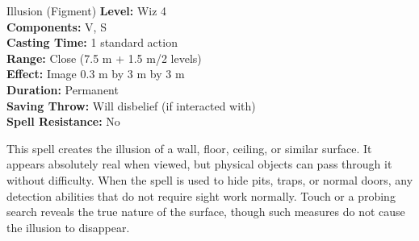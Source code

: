 {Illusion (Figment)}
{
	\textbf{Level:}
	Wiz 4\\
	\textbf{Components:}
	V, S\\
	\textbf{Casting Time:}
	1 standard action\\
	\textbf{Range:}
	Close (7.5 m + 1.5 m/2 levels)\\
	\textbf{Effect:}
	Image 0.3 m by 3 m by 3 m\\
	\textbf{Duration:}
	Permanent\\
	\textbf{Saving Throw:}
	Will disbelief (if interacted with)\\
	\textbf{Spell Resistance:}
	No\\
}
{
	This spell creates the illusion of a wall, floor, ceiling, or similar surface. It appears absolutely real when viewed, but physical objects can pass through it without difficulty. When the spell is used to hide pits, traps, or normal doors, any detection abilities that do not require sight work normally. Touch or a probing search reveals the true nature of the surface, though such measures do not cause the illusion to disappear.

}
